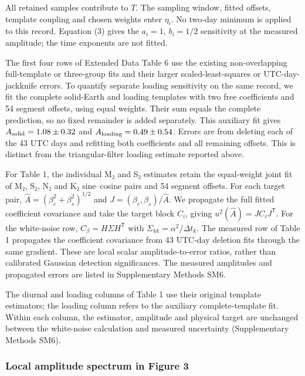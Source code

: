\documentclass[
  11pt,
  a4paper,
]{article}
\begin{document}
All retained samples contribute to \(T\). The sampling window, fitted
offsets, template coupling and chosen weights enter \(\eta_i\). No
two-day minimum is applied to this record. Equation (3) gives the
\(a_i=1\), \(b_i=1/2\) sensitivity at the measured amplitude; the time
exponents are not fitted.

The first four rows of Extended Data Table 6 use the existing
non-overlapping full-template or three-group fits and their larger
scaled-least-squares or UTC-day-jackknife errors. To quantify separate
loading sensitivity on the same record, we fit the complete solid-Earth
and loading templates with two free coefficients and 54 segment offsets,
using equal weights. Their sum equals the complete prediction, so no
fixed remainder is added separately. This auxiliary fit gives
\(A_{\rm solid}=1.08\pm0.32\) and \(A_{\rm loading}=0.49\pm0.54\).
Errors are from deleting each of the 43 UTC days and refitting both
coefficients and all remaining offsets. This is distinct from the
triangular-filter loading estimate reported above.

For Table 1, the individual M₂ and S₂ estimates retain the equal-weight
joint fit of M₂, S₂, N₂ and K₂ sine--cosine pairs and 54 segment
offsets. For each target pair, \(\hat A=(\beta_c^2+\beta_s^2)^{1/2}\)
and \(J=(\beta_c,\beta_s)/\hat A\). We propagate the full fitted
coefficient covariance and take the target block \(C_i\), giving
\(u^2(\hat A)=JC_iJ^{\mathsf T}\). For the white-noise row,
\(C_\beta=H\Sigma H^{\mathsf T}\) with
\(\Sigma_{kk}=\alpha^2/\Delta t_k\). The measured row of Table 1
propagates the coefficient covariance from 43 UTC-day deletion fits
through the same gradient. These are local scalar amplitude-to-error
ratios, rather than calibrated Gaussian detection significances. The
measured amplitudes and propagated errors are listed in Supplementary
Methods SM6.

The diurnal and loading columns of Table 1 use their original template
estimators; the loading column refers to the auxiliary complete-template
fit. Within each column, the estimator, amplitude and physical target
are unchanged between the white-noise calculation and measured
uncertainty (Supplementary Methods SM6).

\hypertarget{local-amplitude-spectrum-in-figure-3}{%
\subsubsection{Local amplitude spectrum in Figure
3}\label{local-amplitude-spectrum-in-figure-3}}
\end{document}
